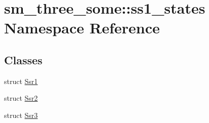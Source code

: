 \hypertarget{namespacesm__three__some_1_1ss1__states}{}\section{sm\+\_\+three\+\_\+some\+:\+:ss1\+\_\+states Namespace Reference}
\label{namespacesm__three__some_1_1ss1__states}
\subsection*{Classes}
\begin{DoxyCompactItemize}
\item 
struct \hyperlink{structsm__three__some_1_1ss1__states_1_1Ssr1}{Ssr1}
\item 
struct \hyperlink{structsm__three__some_1_1ss1__states_1_1Ssr2}{Ssr2}
\item 
struct \hyperlink{structsm__three__some_1_1ss1__states_1_1Ssr3}{Ssr3}
\end{DoxyCompactItemize}
